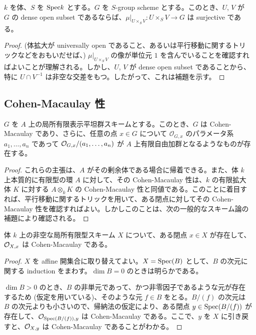 \begin{lem}
  $k$ を体、$S$ を $\mathrm{Spec} k$ とする。$G$ を $S$-group scheme とする。このとき、$U$, $V$ が $G$ の dense open subset であるならば、$\mu|_{U \times_S V} \colon U \times_S V \to G$ は surjective である。
\end{lem}
\begin{proof}
  (体拡大が universally open であること、あるいは平行移動に関するトリックなどをおもいだせば、) $\mu|_{U \times_S V}$ の像が単位元 $1$ を含んでいることを確認すればよいことが理解される。しかし、$U$, $V$ が dense open subset であることから、特に $U \cap V^{-1}$ は非空な交差をもつ。したがって、これは補題を示す。
\end{proof}

\subsection{Cohen-Macaulay 性}
\begin{prop}
  $G$ を $A$ 上の局所有限表示平坦群スキームとする。このとき、$G$ は Cohen-Macaulay であり、さらに、任意の点 $x \in G$ について $\mathcal{O}_{G, x}$ のパラメータ系 $a_1, \ldots, a_n$ であって $\mathcal{O}_{G, x} / (a_1, \ldots, a_n)$ が $A$ 上有限自由加群となるようなものが存在する。
\end{prop}
\begin{proof}
  これらの主張は、$A$ がその剰余体である場合に帰着できる。また、体 $k$ 上本質的に有限型の環 $A$ に対して、その Cohen-Macaulay 性は、$k$ の有限拡大体 $K$ に対する $A \otimes_k K$ の Cohen-Macaulay 性と同値である。このことに着目すれば、平行移動に関するトリックを用いて、ある閉点に対してその Cohen-Macaulay 性を確認すればよい。しかしこのことは、次の一般的なスキーム論の補題により確認される。
\end{proof}

\begin{lem}
  体 $k$ 上の非空な局所有限型スキーム $X$ について、ある閉点 $x \in X$ が存在して、$\mathcal{O}_{X, x}$ は Cohen-Macaulay である。
\end{lem}
\begin{proof}
  $X$ を affine 開集合に取り替えてよい。$X = \mathrm{Spec}(B)$ として、$B$ の次元に関する induction をまわす。$\dim B = 0$ のときは明らかである。

  $\dim B > 0$ のとき、$B$ の非単元であって、かつ非零因子であるような元が存在するため (仮定を用いている)、そのような元 $f \in B$ をとる。$B / (f)$ の次元は $B$ の次元よりも小さいので、帰納法の仮定により、ある閉点 $y \in \mathrm{Spec}(B / (f))$ が存在して、$\mathcal{O}_{\mathrm{Spec}(B / (f)), y}$ は Cohen-Macaulay である。ここで、$y$ を $X$ に引き戻すと、$\mathcal{O}_{X, y}$ は Cohen-Macaulay であることがわかる。
\end{proof}

